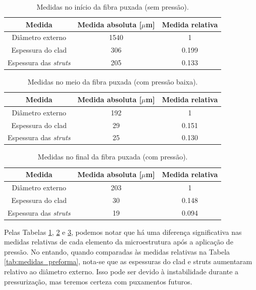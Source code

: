 \documentclass[12pt,a4paper]{article}
\begin{document}
  \begin{table}[H]
    \centering
	  \begin{tabular}{ccc}	
		  \textbf{Medida} & \textbf{Medida absoluta [$\mu$m]} & \textbf{Medida relativa} \\ 
		\hline
		  Diâmetro externo & 1540 & 1 \\
		  Espessura do clad & 306 & 0.199\\
		  Espessura das \textit{struts} & 205 & 0.133
	  \end{tabular}
	  \caption{Medidas no início da fibra puxada (sem pressão).}
	  \label{tab:fibra_inicio}
  \end{table}

  \begin{table}[H]
    \centering
	  \begin{tabular}{ccc}	
		  \textbf{Medida} & \textbf{Medida absoluta [$\mu$m]} & \textbf{Medida relativa} \\ 
		\hline
		  Diâmetro externo & 192 & 1 \\
		  Espessura do clad & 29 & 0.151 \\
		  Espessura das \textit{struts} & 25 & 0.130
	  \end{tabular}
	  \caption{Medidas no meio da fibra puxada (com pressão baixa).}
	  \label{tab:fibra_meio}
  \end{table}

  \begin{table}[H]
    \centering
	  \begin{tabular}{ccc}	
		  \textbf{Medida} & \textbf{Medida absoluta [$\mu$m]} & \textbf{Medida relativa} \\ 
		\hline
		  Diâmetro externo & 203 & 1 \\
		  Espessura do clad & 30 & 0.148 \\
		  Espessura das \textit{struts} & 19 & 0.094
	  \end{tabular}
	  \caption{Medidas no final da fibra puxada (com pressão).}
	  \label{tab:fibra_final}
  \end{table}

  Pelas Tabelas \ref{tab:fibra_inicio}, \ref{tab:fibra_meio} e \ref{tab:fibra_final}, podemos notar que há uma diferença significativa nas medidas relativas de cada elemento da microestrutura após a aplicação de pressão.
  No entando, quando comparadas às medidas relativas na Tabela \ref{tab:medidas_preforma}, nota-se que as espessuras do clad e struts aumentaram relativo ao diâmetro externo. Isso pode ser devido à instabilidade durante a pressurização, mas teremos certeza com puxamentos futuros.
\end{document}
